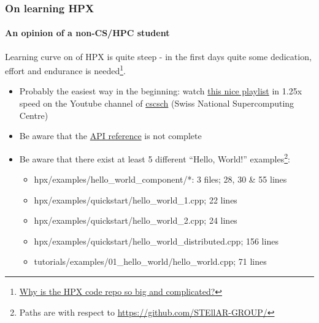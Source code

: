 \begin{frame}
\frametitle{On learning HPX}
\framesubtitle{An opinion of a non-CS/HPC student}
Learning curve on of HPX is quite steep - in the first days quite some dedication, effort and endurance is needed\footnote{\color{fzjblue} \href{https://github.com/STEllAR-GROUP/tutorials/blob/master/hlrs2017/session1/README.md}{Why is the HPX code repo so big and complicated?}}.
\begin{itemize}
  \item Probably the easiest way in the beginning: watch
    \color{fzjblue}\href{https://www.youtube.com/playlist?list=PL1tk5lGm7zvSXfS-sqOOmIJ0lFNjKze18}{this nice playlist}
    \color{black} in 1.25x speed on the Youtube channel of
    \color{fzjblue}\href{https://www.youtube.com/user/cscsch}{cscsch}
    \color{black}(Swiss National Supercomputing Centre)
  \item Be aware that the
    \color{fzjblue}\href{https://stellar-group.github.io/hpx/docs/sphinx/latest/html/api.html}{API reference}
    \color{black}is not complete
  \item Be aware that there exist at least 5 different ``Hello, World!'' examples\footnote{Paths are with respect to \color{fzjblue}\url{https://github.com/STEllAR-GROUP/}\color{black}}:
  \begin{itemize}
    \item hpx/examples/hello\_world\_component/*: 3 files; 28, 30 \& 55 lines
    \item hpx/examples/quickstart/hello\_world\_1.cpp; 22 lines
    \item hpx/examples/quickstart/hello\_world\_2.cpp; 24 lines
    \item hpx/examples/quickstart/hello\_world\_distributed.cpp; 156 lines
    \item tutorials/examples/01\_hello\_world/hello\_world.cpp; 71 lines
  \end{itemize}
\end{itemize}
\end{frame}

